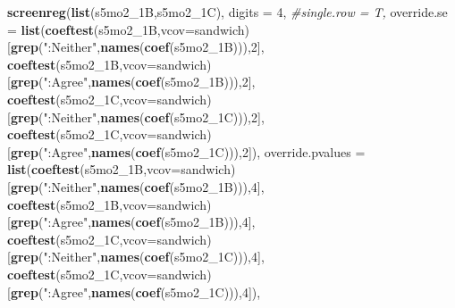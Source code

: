 \documentclass[
]{article}
\newenvironment{Shaded}{\begin{snugshade}}{\end{snugshade}}
\newcommand{\CommentTok}[1]{\textcolor[rgb]{0.56,0.35,0.01}{\textit{#1}}}
\newcommand{\DataTypeTok}[1]{\textcolor[rgb]{0.13,0.29,0.53}{#1}}
\newcommand{\DecValTok}[1]{\textcolor[rgb]{0.00,0.00,0.81}{#1}}
\newcommand{\KeywordTok}[1]{\textcolor[rgb]{0.13,0.29,0.53}{\textbf{#1}}}
\newcommand{\NormalTok}[1]{#1}
\newcommand{\StringTok}[1]{\textcolor[rgb]{0.31,0.60,0.02}{#1}}
\begin{document}
\begin{Shaded}
\begin{Highlighting}[]
\KeywordTok{screenreg}\NormalTok{(}\KeywordTok{list}\NormalTok{(s5mo2_1B,s5mo2_1C), }\DataTypeTok{digits =} \DecValTok{4}\NormalTok{, }\CommentTok{#single.row = T,}
          \DataTypeTok{override.se =} \KeywordTok{list}\NormalTok{(}\KeywordTok{coeftest}\NormalTok{(s5mo2_1B,}\DataTypeTok{vcov=}\NormalTok{sandwich)[}\KeywordTok{grep}\NormalTok{(}\StringTok{":Neither"}\NormalTok{,}\KeywordTok{names}\NormalTok{(}\KeywordTok{coef}\NormalTok{(s5mo2_1B))),}\DecValTok{2}\NormalTok{],}
                             \KeywordTok{coeftest}\NormalTok{(s5mo2_1B,}\DataTypeTok{vcov=}\NormalTok{sandwich)[}\KeywordTok{grep}\NormalTok{(}\StringTok{":Agree"}\NormalTok{,}\KeywordTok{names}\NormalTok{(}\KeywordTok{coef}\NormalTok{(s5mo2_1B))),}\DecValTok{2}\NormalTok{],}
                             \KeywordTok{coeftest}\NormalTok{(s5mo2_1C,}\DataTypeTok{vcov=}\NormalTok{sandwich)[}\KeywordTok{grep}\NormalTok{(}\StringTok{":Neither"}\NormalTok{,}\KeywordTok{names}\NormalTok{(}\KeywordTok{coef}\NormalTok{(s5mo2_1C))),}\DecValTok{2}\NormalTok{],}
                             \KeywordTok{coeftest}\NormalTok{(s5mo2_1C,}\DataTypeTok{vcov=}\NormalTok{sandwich)[}\KeywordTok{grep}\NormalTok{(}\StringTok{":Agree"}\NormalTok{,}\KeywordTok{names}\NormalTok{(}\KeywordTok{coef}\NormalTok{(s5mo2_1C))),}\DecValTok{2}\NormalTok{]),}
          \DataTypeTok{override.pvalues =} \KeywordTok{list}\NormalTok{(}\KeywordTok{coeftest}\NormalTok{(s5mo2_1B,}\DataTypeTok{vcov=}\NormalTok{sandwich)[}\KeywordTok{grep}\NormalTok{(}\StringTok{":Neither"}\NormalTok{,}\KeywordTok{names}\NormalTok{(}\KeywordTok{coef}\NormalTok{(s5mo2_1B))),}\DecValTok{4}\NormalTok{],}
                                  \KeywordTok{coeftest}\NormalTok{(s5mo2_1B,}\DataTypeTok{vcov=}\NormalTok{sandwich)[}\KeywordTok{grep}\NormalTok{(}\StringTok{":Agree"}\NormalTok{,}\KeywordTok{names}\NormalTok{(}\KeywordTok{coef}\NormalTok{(s5mo2_1B))),}\DecValTok{4}\NormalTok{],}
                                  \KeywordTok{coeftest}\NormalTok{(s5mo2_1C,}\DataTypeTok{vcov=}\NormalTok{sandwich)[}\KeywordTok{grep}\NormalTok{(}\StringTok{":Neither"}\NormalTok{,}\KeywordTok{names}\NormalTok{(}\KeywordTok{coef}\NormalTok{(s5mo2_1C))),}\DecValTok{4}\NormalTok{],}
                                  \KeywordTok{coeftest}\NormalTok{(s5mo2_1C,}\DataTypeTok{vcov=}\NormalTok{sandwich)[}\KeywordTok{grep}\NormalTok{(}\StringTok{":Agree"}\NormalTok{,}\KeywordTok{names}\NormalTok{(}\KeywordTok{coef}\NormalTok{(s5mo2_1C))),}\DecValTok{4}\NormalTok{]),}

\end{Highlighting}
\end{Shaded}
\end{document}
